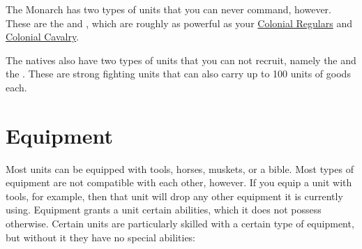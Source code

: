 \documentclass[12pt]{book}
\begin{document}
The Monarch has two types of units that you can never command,
however. These are the  and , which are roughly as powerful as your \hyperlink{Colonial
Regular}{Colonial Regulars} and \hyperlink{Colonial Cavalry}{Colonial
Cavalry}.

The natives also have two types of units that you can not recruit,
namely the  and the . These are
strong fighting units that can also carry up to 100 units of goods
each.


\hypertarget{Equipment}{\section{Equipment}}

Most units can be equipped with tools, horses, muskets, or a bible.
Most types of equipment are not compatible with each other,
however. If you equip a unit with tools, for example, then that unit
will drop any other equipment it is currently using. Equipment grants
a unit certain abilities, which it does not possess otherwise. Certain
units are particularly skilled with a certain type of equipment, but
without it they have no special abilities:
\end{document}
